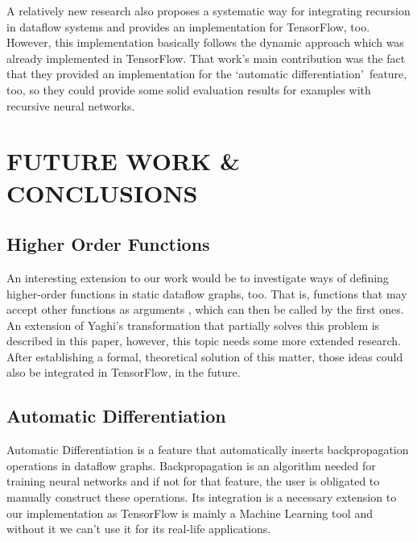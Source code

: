\documentclass[ack,preface]{dithesis}
\begin{document}
A relatively new research \cite{Jeong:2018} also proposes a systematic way for integrating recursion in dataflow systems and provides an implementation for TensorFlow, too. However, 
this implementation basically follows the dynamic approach which was already implemented in TensorFlow. That work's main contribution was the fact that they provided an implementation for the \lq automatic differentiation\rq  \ feature, too, so they could provide some solid evaluation results for examples with recursive neural networks.

\chapter{FUTURE WORK \& CONCLUSIONS}


   \section{Higher Order Functions}

An interesting extension to our work would be to investigate ways of defining higher-order functions in static dataflow graphs, too. That is, functions that may accept other functions as arguments , which can then be called by the first ones. An extension of Yaghi's transformation that partially solves this problem is described in this  \cite{RondogiannisW99} paper, however, this topic needs some more extended research. After establishing a formal, theoretical solution of this matter, those ideas could also be integrated in TensorFlow, in the future.

    \section{Automatic Differentiation}

Automatic Differentiation is a feature that automatically inserts backpropagation operations in dataflow graphs. Backpropagation is an algorithm needed for training neural networks and if not for that feature, the user is obligated to manually construct these operations. Its integration is a necessary extension to our implementation as TensorFlow is mainly a  Machine Learning tool and without it we can't use it for its real-life applications.
\end{document}

